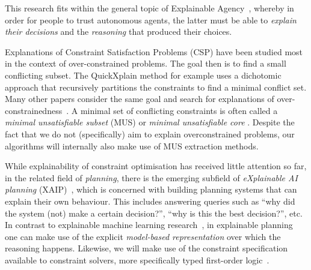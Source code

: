 This research fits within the general topic of Explainable Agency~\cite{langley2017explainable}, whereby in order for people to trust autonomous agents, the latter must be able to \textit{explain their decisions} and the \textit{reasoning} that produced their choices.



Explanations of Constraint Satisfaction Problems (CSP) have been studied most in the context of over-constrained problems.
The goal then is to find a small conflicting subset.
The QuickXplain method \cite{junker2001quickxplain} for example uses a dichotomic approach that recursively partitions the constraints to find a minimal conflict set. Many other papers consider the same goal and search for explanations of over-constrainedness~\cite{leo2017debugging,zeighami2018towards}.
A minimal set of conflicting constraints is often called a \emph{minimal unsatisfiable subset} (MUS) or \emph{minimal unsatisfiable core} \cite{marques2010minimal}. Despite the fact that we do not (specifically) aim to explain overconstrained problems, our algorithms will internally also make use of MUS extraction methods.


While explainability of constraint optimisation has received little attention so far, in the related field of \textit{planning}, there is the emerging subfield of \textit{eXplainable AI planning} (XAIP)~\cite{fox2017explainable}, which is concerned with building planning systems that can explain their own behaviour. This includes answering queries such as ``why did the system (not) make a certain decision?'', ``why is this the best decision?'', etc. In contrast to explainable machine learning research~\cite{guidotti2018survey}, in explainable planning one can make use of the explicit \textit{model-based representation} over which the reasoning happens. Likewise, we will make use of the constraint specification available to constraint solvers, more specifically typed first-order logic~\cite{atcl/Wittocx13}.

% 
% 

